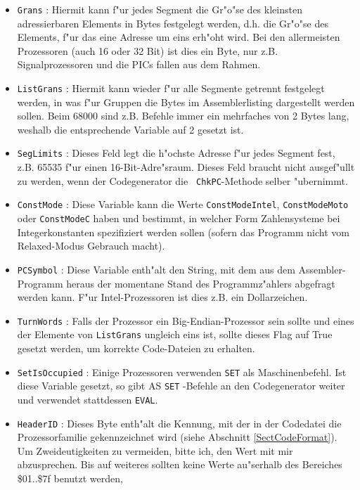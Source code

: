 \documentclass[12pt,a4paper,twoside]{report}
\newcommand{\tty}[1]{{\tt #1}}
\begin{document}
{\begin{itemize}
\item{\tty{Grans} : Hiermit kann f"ur jedes Segment die Gr"o"se des kleinsten
      adressierbaren Elements in Bytes festgelegt werden, d.h. die
      Gr"o"se des Elements, f"ur das eine Adresse um eins erh"oht wird.
      Bei den allermeisten Prozessoren (auch 16 oder 32 Bit) ist dies
      ein Byte, nur z.B. Signalprozessoren und die PICs fallen aus dem
      Rahmen.}
\item{\tty{ListGrans} : Hiermit kann wieder f"ur alle Segmente getrennt
      festgelegt werden, in was f"ur Gruppen die Bytes im Assemblerlisting
      dargestellt werden sollen.  Beim 68000 sind z.B. Befehle immer
      ein mehrfaches von 2 Bytes lang, weshalb die entsprechende Variable
      auf 2 gesetzt ist.}
\item{\tty{SegLimits} : Dieses Feld legt die h"ochste Adresse f"ur jedes
      Segment fest, z.B. 65535 f"ur einen 16-Bit-Adre"sraum.  Dieses Feld
      braucht nicht ausgef"ullt zu werden, wenn der Codegenerator die {\tt
      ChkPC}-Methode selber "ubernimmt.}
\item{\tty{ConstMode} : Diese Variable kann die Werte \tty{ConstModeIntel},
      \tty{ConstModeMoto} oder \tty{ConstModeC} haben und bestimmt, in
      welcher Form Zahlensysteme bei Integerkonstanten spezifiziert werden
      sollen (sofern das Programm nicht vom Relaxed-Modus Gebrauch macht).}
\item{\tty{PCSymbol} : Diese Variable enth"alt den String, mit dem aus dem
      Assembler-Programm heraus der momentane Stand des Programmz"ahlers
      abgefragt werden kann.  F"ur Intel-Prozessoren ist dies z.B. ein
      Dollarzeichen.}
\item{\tty{TurnWords} : Falls der Prozessor ein Big-Endian-Prozessor sein
      sollte und eines der Elemente von \tty{ListGrans} ungleich eins ist,
      sollte dieses Flag auf True gesetzt werden, um korrekte Code-Dateien
      zu erhalten.}
\item{\tty{SetIsOccupied} : Einige Prozessoren verwenden \tty{SET} als
      Maschinenbefehl.  Ist diese Variable gesetzt, so gibt AS \tty{SET}
      -Befehle an den Codegenerator weiter und verwendet stattdessen
      \tty{EVAL}.}
\item{\tty{HeaderID} : Dieses Byte enth"alt die Kennung, mit der in der Codedatei
      die Prozessorfamilie gekennzeichnet wird (siehe Abschnitt
      \ref{SectCodeFormat}).  Um Zweideutigkeiten zu vermeiden,
      bitte ich, den Wert mit mir abzusprechen.  Bis auf weiteres sollten
      keine Werte au"serhalb des Bereiches \$01..\$7f benutzt werden,
}
\end{itemize}}
\end{document}
